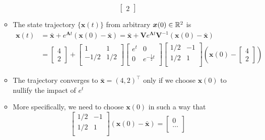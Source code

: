 \documentclass[12pt,a4paper]{article}
\begin{document}
\begin{itemize}
\begin{itemize}
\begin{equation}
\begin{bmatrix}
        2
      \end{bmatrix}
    \end{equation}
  \item The state trajectory $\{\bm{x}(t)\}$ from arbitrary $\bm{x}(0)\in \mathbb{R}^{2}$ is
    \begin{align}
      \bm{x}(t)
      & = \bar{\bm{x}} + e^{\bm{A}t}(\bm{x}(0)-\bar{\bm{x}})
        =
        \bar{\bm{x}}
        +
        \bm{V}e^{\bm{\Lambda}t}\bm{V}^{-1}(\bm{x}(0)-\bar{\bm{x}})        
        \nonumber \\
        & 
        =
        \begin{bmatrix} 4 \\ 2 \end{bmatrix}
        +
      \begin{bmatrix}
        1 & 1 \\
        -1/2 & 1/2 \\
      \end{bmatrix}
      \begin{bmatrix}
        e^{t} & 0 \\
        0 & e^{- \frac{1}{2}t} \\
      \end{bmatrix}
      \begin{bmatrix}
        1/2 & -1 \\
        1/2 & 1 \\
      \end{bmatrix}
      \left(\bm{x}(0) - \begin{bmatrix} 4 \\ 2 \end{bmatrix}\right)
    \nonumber%
    \end{align}
    \item
      The trajectory converges to $\bar{\bm{x}}=(4, 2)^{\top}$
      only if we choose $\bm{x}(0)$
      to nullify the impact of $e^{t}$
    \item More specifically, we need to choose $\bm{x}(0)$
      in such a way that
      \begin{equation}\nonumber%
      \begin{bmatrix}
        1/2 & -1 \\
        1/2 & 1 \\
      \end{bmatrix}
      (\bm{x}(0)-\bar{\bm{x}})
      = 
      \begin{bmatrix}
        0 \\
        \ldots \\

\end{bmatrix}
\end{equation}
\end{itemize}
\end{itemize}
\end{document}
